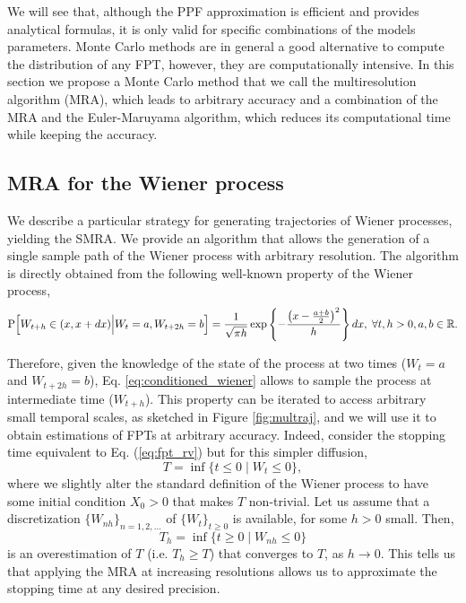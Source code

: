 \documentclass[preprint,12pt]{elsarticle}
\numberwithin{equation}{section}
\theoremstyle{plain} \newtheorem{theorem}{Theorem}[section]
\theoremstyle{plain} \newtheorem{proposition}[theorem]{Proposition}
\theoremstyle{plain} \newtheorem{lemma}[theorem]{Lemma}
\theoremstyle{plain} \newtheorem{corollary}[theorem]{Corollary}
\theoremstyle{definition} \newtheorem{definition}[theorem]{Definition}
\theoremstyle{definition} \newtheorem{notation}[theorem]{Notation}
\theoremstyle{remark} \newtheorem{remark}[theorem]{Remark}
\theoremstyle{remark} \newtheorem{remarks}[theorem]{Remarks}
\theoremstyle{remark} \newtheorem{algorithm2}[theorem]{Algorithm}
\theoremstyle{remark} \newtheorem{example}[theorem]{Example}
\begin{document}
We will see that, although the PPF approximation is efficient and provides analytical formulas, it is only valid for specific combinations of the models parameters. 
Monte Carlo methods are in general a good alternative to compute the distribution of any FPT, however, they are computationally intensive.
In this section we propose a Monte Carlo method that we call the multiresolution algorithm (MRA), which leads to arbitrary accuracy and a combination of the MRA and the Euler-Maruyama algorithm, which reduces its computational time while keeping the accuracy.  

\subsection{MRA for the Wiener process}
\label{subsec:pure}

We describe a particular
strategy for generating trajectories of
Wiener processes, yielding the SMRA.
We provide an algorithm that allows the 
generation of a single sample path
of the Wiener process with arbitrary
resolution. The algorithm is
directly obtained from the following well-known
property of the Wiener process,
\begin{equation}\label{eq:conditioned_wiener}
    \mathrm{P} \Bigl[W_{t+h}\in (x,x+dx) \Big\vert W_t = a, W_{t+2h}=b \Bigr] = \frac{1}{\sqrt{\pi h}}\exp\left\{-\frac{\left(x-{\frac{a+b}{2}}\right)^2}{h}\right\} dx,
\; \forall t,h > 0, a,b \in \mathbb{R}.
\end{equation}

Therefore, given the knowledge of the state of the process at two times ($W_t=a$ and $W_{t+2h}=b$), Eq. \eqref{eq:conditioned_wiener} allows to sample the process at intermediate time ($ W_{t+h}$).  This property can be iterated to 
access arbitrary small temporal scales, as sketched in Figure  \ref{fig:multraj}, 
and we will use it to obtain estimations of FPTs at arbitrary accuracy.
Indeed, consider the stopping time equivalent to Eq. (\ref{eq:fpt_rv}) but for this simpler diffusion, $$T=\inf\{ t \le 0 \mid W_t \le 0\},$$
where we slightly alter the standard definition of the Wiener process to have some initial condition $X_0>0$ that makes $T$ non-trivial. Let us assume that
a discretization 
$\{W_{nh}\}_{n=1,2,\ldots}$ 
of $\{ W_t \}_{t \ge 0}$
is available, for some $h>0$ small. Then,
$$T_{h}=\inf\{ t \ge 0 \mid W_{nh} \le 0\}$$ is
an overestimation of $T$ (i.e. $T_h\ge T$) that converges to
$T$, as $h \to 0$. This tells us that
applying the MRA at increasing resolutions allows us to approximate the stopping time
at any desired precision. 
\end{document}

